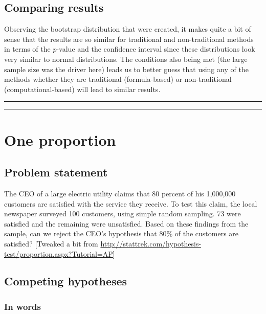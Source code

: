 \documentclass[12pt,]{krantz}
\theoremstyle{definition}
\theoremstyle{definition}
\theoremstyle{definition}
\theoremstyle{remark}
\begin{document}
\subsection{Comparing results}\label{comparing-results}

Observing the bootstrap distribution that were created, it makes quite a
bit of sense that the results are so similar for traditional and
non-traditional methods in terms of the \(p\)-value and the confidence
interval since these distributions look very similar to normal
distributions. The conditions also being met (the large sample size was
the driver here) leads us to better guess that using any of the methods
whether they are traditional (formula-based) or non-traditional
(computational-based) will lead to similar results.

\begin{center}\rule{0.5\linewidth}{\linethickness}\end{center}

\begin{center}\rule{0.5\linewidth}{\linethickness}\end{center}

\section{One proportion}\label{one-proportion}

\subsection{Problem statement}\label{problem-statement-1}

The CEO of a large electric utility claims that 80 percent of his
1,000,000 customers are satisfied with the service they receive. To test
this claim, the local newspaper surveyed 100 customers, using simple
random sampling. 73 were satisfied and the remaining were unsatisfied.
Based on these findings from the sample, can we reject the CEO's
hypothesis that 80\% of the customers are satisfied? {[}Tweaked a bit
from
\url{http://stattrek.com/hypothesis-test/proportion.aspx?Tutorial=AP}{]}

\subsection{Competing hypotheses}\label{competing-hypotheses-1}

\subsubsection*{In words}\label{in-words-1}
\end{document}
